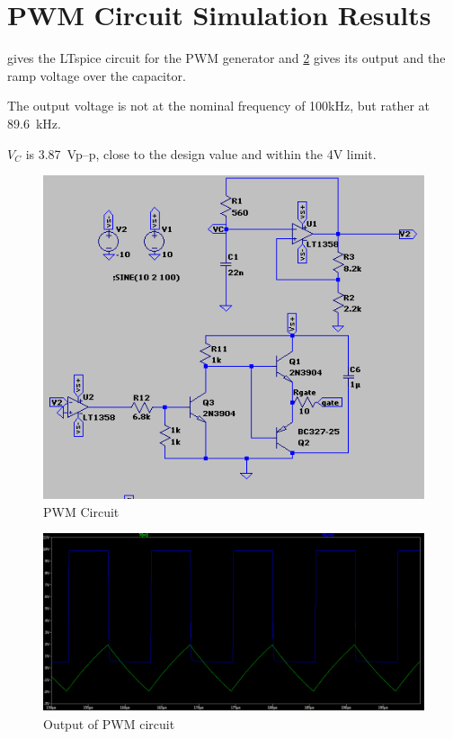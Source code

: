 \section{PWM Circuit Simulation Results}
 gives the LTspice circuit for the PWM generator and \cref{fig:pwm-output} gives its output and the ramp voltage over the capacitor.

The output voltage is not at the nominal frequency of 100kHz, but rather at \SI{89.6}{\kilo\hertz}. 

$V_C$ is \SI{3.87}{\volt}p--p, close to the design value and within the 4V limit.


\begin{figure}
	\centering
	\includegraphics[width=\linewidth]{img/PWMCircuit}
	\caption{PWM Circuit}
	\label{fig:pwmcircuit}
\end{figure}

\begin{figure}
	\centering
	\includegraphics[width=\linewidth]{"img/PWM Output"}
	\caption{Output of PWM circuit}
	\label{fig:pwm-output}
\end{figure}


